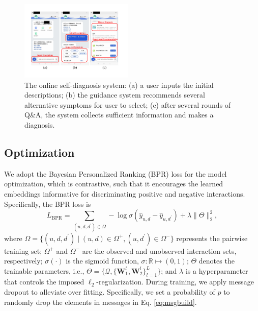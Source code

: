 \documentclass[sigconf]{acmart}
\newcommand{\W}{\bm{W}}
\begin{document}
\begin{figure}[t]
\centering
\includegraphics[width=0.48\textwidth]{fig3.pdf}
\caption{The online self-diagnosis system: (a) a user inputs the initial descriptions; (b) the guidance system recommends several alternative symptoms for user to select; (c) after several rounds of Q\&A, the system collects sufficient information and makes a diagnosis. \label{fig:3}}
\end{figure}

\subsection{Optimization}
We adopt the Bayesian Personalized Ranking (BPR) loss \cite{rendle2012bpr} for the model optimization, which is contrastive, such that it encourages the learned embeddings informative for discriminating positive and negative interactions. Specifically, the BPR loss is
\begin{equation}
L_{\text{BPR}} = \sum_{(u,d,d^\prime) \in \Omega} -\log \sigma(\hat{y}_{u,d} - \hat{y}_{u,d^\prime}) + \lambda \|\Theta\|^2_2,
\end{equation}
where $\Omega=\{(u,d,d^\prime) \mid (u,d) \in \Omega^+, (u,d^\prime) \in \Omega^-\}$ represents the pairwise training set; $\Omega^+$ and $\Omega^-$ are the observed and unobserved interaction sets, respectively; $\sigma(\cdot)$ is the sigmoid function, $\sigma: \mathbb{R} \mapsto (0,1)$; $\Theta$ denotes the trainable parameters, i.e., $\Theta = \{\mathcal{Q}, \{ \W^l_1, \W_2^l\}_{l=1}^L\}$; and $\lambda$ is a hyperparameter that controls the imposed $\ell_2$-regularization. During training, we apply message dropout \cite{wang2019neural} to alleviate over fitting. Specifically, we set a probability of $p$ to randomly drop the elements in messages in Eq. \eqref{eq:msgbuild}. 
\end{document}
